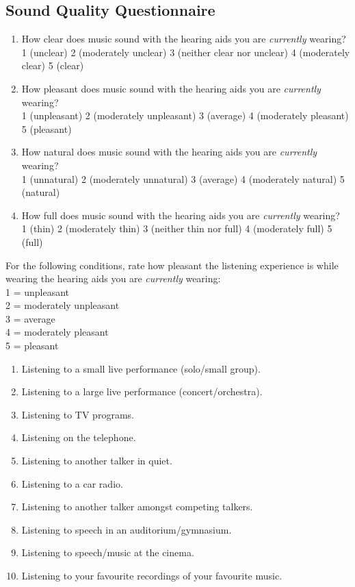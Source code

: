 \begin{appendices}


\chapter{Sound Quality Questionnaire}
\singlespacing
\begin{enumerate}
\item How clear does music sound with the hearing aids you are \textit{currently} wearing? \\
1 (unclear) 2 (moderately unclear) 3 (neither clear nor unclear) 4 (moderately clear) 5 (clear)
\item How pleasant does music sound with the hearing aids you are \textit{currently} wearing? \\
1 (unpleasant) 2 (moderately unpleasant) 3 (average) 4 (moderately pleasant) 5 (pleasant)
\item How natural does music sound with the hearing aids you are \textit{currently} wearing? \\
1 (unnatural) 2 (moderately unnatural) 3 (average) 4 (moderately natural) 5 (natural)
\item How full does music sound with the hearing aids you are \textit{currently} wearing? \\
1 (thin) 2 (moderately thin) 3 (neither thin nor full) 4 (moderately full) 5 (full)
\end{enumerate}

\noindent For the following conditions, rate how pleasant the listening experience is while wearing the hearing aids you are \textit{currently} wearing: \\
1 = unpleasant \\
2 = moderately unpleasant \\
3 = average \\
4 = moderately pleasant \\
5 = pleasant
\begin{enumerate}
\item Listening to a small live performance (solo/small group).
\item Listening to a large live performance (concert/orchestra).
\item Listening to TV programs.
\item Listening on the telephone.
\item Listening to another talker in quiet.
\item Listening to a car radio.
\item Listening to another talker amongst competing talkers.
\item Listening to speech in an auditorium/gymnasium.
\item Listening to speech/music at the cinema.
\item Listening to your favourite recordings of your favourite music.
\end{enumerate}
\doublespacing

\end{appendices}